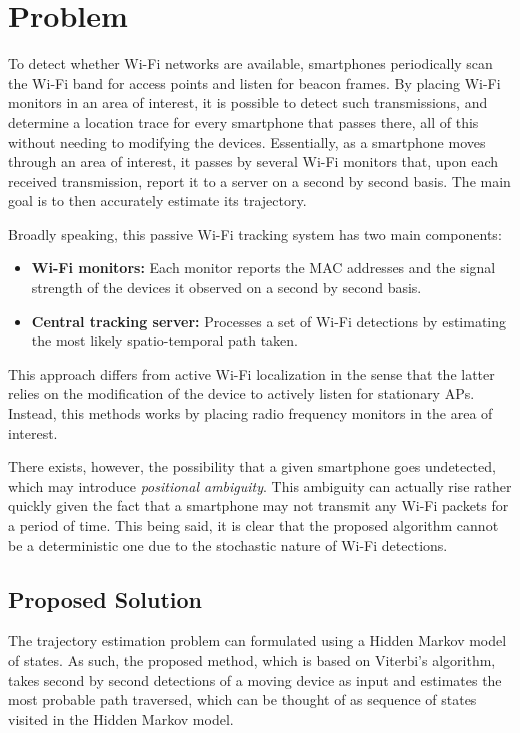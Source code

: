 \documentclass[conference]{IEEEtran}
\begin{document}
\section{Problem} \label{sec:problem}

To detect whether Wi-Fi networks are available, smartphones periodically scan 
the Wi-Fi band for access points and listen for beacon frames. By placing Wi-Fi 
monitors in an area of interest, it is possible to detect such transmissions, 
and determine a location trace for every smartphone that passes there, all of 
this without needing to modifying the devices. Essentially, as a smartphone 
moves through an area of interest, it passes by several Wi-Fi monitors that, 
upon each received transmission, report it to a server on a second by second 
basis. The main goal is to then accurately estimate its trajectory.

Broadly speaking, this passive Wi-Fi tracking system has two main components:

\begin{itemize}
    \item \textbf{Wi-Fi monitors:} Each monitor reports the MAC addresses and 
the signal strength of the devices it observed on a second by second basis.
     \item \textbf{Central tracking server:} Processes a set of Wi-Fi 
detections by estimating the most likely spatio-temporal path taken.
\end{itemize}

This approach differs from active Wi-Fi localization in the sense that the 
latter relies on the modification of the device to actively listen for 
stationary APs. Instead, this methods works by placing radio frequency monitors 
in the area of interest.

There exists, however, the possibility that a given smartphone goes undetected, 
which may introduce  \textit{positional ambiguity}. This ambiguity can actually 
rise rather quickly given the fact that a smartphone may not transmit any Wi-Fi 
packets for a period of time. This being said, it is clear that the proposed 
algorithm cannot be a deterministic one due to the stochastic nature of Wi-Fi 
detections.

\subsection{Proposed Solution}

The trajectory estimation problem can formulated using a Hidden Markov model of 
states. As such, the proposed method, which is based on Viterbi’s algorithm, 
takes second by second detections of a moving device as input and estimates the 
most probable path traversed, which can be thought of as sequence of states 
visited in the Hidden Markov model.
\end{document}
